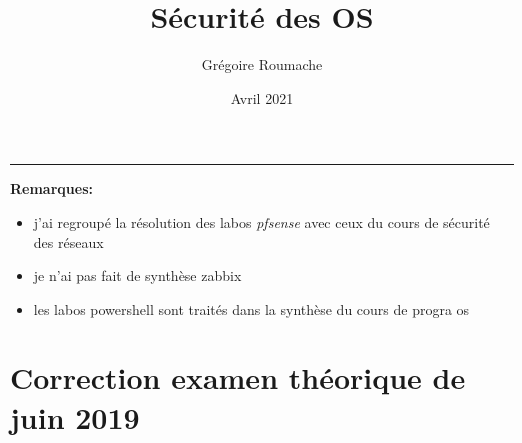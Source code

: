 \documentclass[a4paper]{article}
\title{Sécurité des OS}
\author{Grégoire Roumache}
\date{Avril 2021}
\begin{document}
\maketitle \tableofcontents

\begin{center} \rule{0.99\linewidth}{0.2mm} \end{center}

\textbf{Remarques:}
\begin{itemize}
    \item j'ai regroupé la résolution des labos \textit{pfsense} avec ceux du cours de sécurité des réseaux
    \item je n'ai pas fait de synthèse zabbix
    \item les labos powershell sont traités dans la synthèse du cours de progra os
\end{itemize}















\section{Correction examen théorique de juin 2019}
\end{document}
